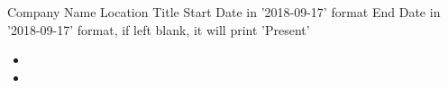 \roleheader
    {Company Name}
    {Location}
    {Title}
    {Start Date in '2018-09-17' format}
    {End Date in '2018-09-17' format, if left blank, it will print 'Present'}

\begin{itemize} \itemsep 0pt
    \item 
    \item 
\end{itemize}